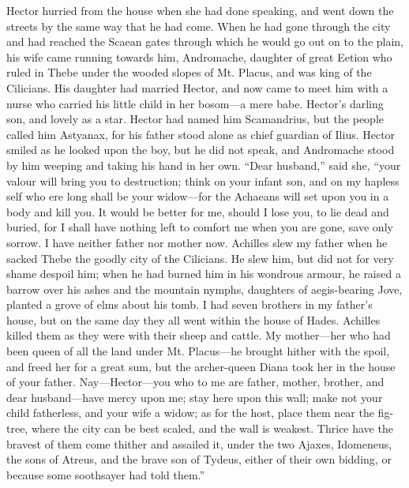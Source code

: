 Hector hurried from the house when she had done speaking, and went down
the streets by the same way that he had come. When he had gone through the
city and had reached the Scaean gates through which he would go out on to
the plain, his wife came running towards him, Andromache, daughter of
great Eetion who ruled in Thebe under the wooded slopes of Mt. Placus, and
was king of the Cilicians. His daughter had married Hector, and now came
to meet him with a nurse who carried his little child in her bosom—a
mere babe. Hector’s darling son, and lovely as a star. Hector had named
him Scamandrius, but the people called him Astyanax, for his father stood
alone as chief guardian of Ilius. Hector smiled as he looked upon the boy,
but he did not speak, and Andromache stood by him weeping and taking his
hand in her own. “Dear husband,” said she, “your valour will bring you to
destruction; think on your infant son, and on my hapless self who ere long
shall be your widow—for the Achaeans will set upon you in a body and
kill you. It would be better for me, should I lose you, to lie dead and
buried, for I shall have nothing left to comfort me when you are gone,
save only sorrow. I have neither father nor mother now. Achilles slew my
father when he sacked Thebe the goodly city of the Cilicians. He slew him,
but did not for very shame despoil him; when he had burned him in his
wondrous armour, he raised a barrow over his ashes and the mountain
nymphs, daughters of aegis-bearing Jove, planted a grove of elms about his
tomb. I had seven brothers in my father’s house, but on the same day they
all went within the house of Hades. Achilles killed them as they were with
their sheep and cattle. My mother—her who had been queen of all the
land under Mt. Placus—he brought hither with the spoil, and freed
her for a great sum, but the archer-queen Diana took her in the house of
your father. Nay—Hector—you who to me are father, mother,
brother, and dear husband—have mercy upon me; stay here upon this
wall; make not your child fatherless, and your wife a widow; as for the
host, place them near the fig-tree, where the city can be best scaled, and
the wall is weakest. Thrice have the bravest of them come thither and
assailed it, under the two Ajaxes, Idomeneus, the sons of Atreus, and the
brave son of Tydeus, either of their own bidding, or because some
soothsayer had told them.”

